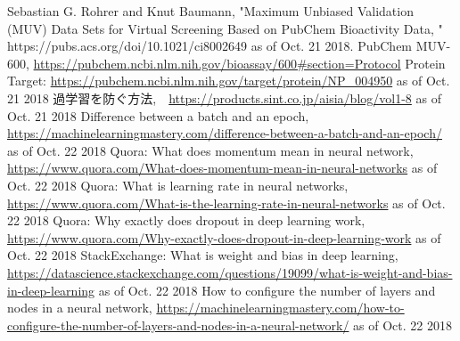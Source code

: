 \documentclass[a4j,11pt]{jarticle}
\begin{document}
\begin{thebibliography}{9}
	 Sebastian G. Rohrer and Knut Baumann, "Maximum Unbiased Validation (MUV) Data Sets for Virtual Screening Based on PubChem Bioactivity Data, "  https://pubs.acs.org/doi/10.1021/ci8002649 as of Oct. 21 2018.
	 PubChem MUV-600, \url{https://pubchem.ncbi.nlm.nih.gov/bioassay/600#section=Protocol} Protein Target: \url{https://pubchem.ncbi.nlm.nih.gov/target/protein/NP_004950} as of Oct. 21 2018
	 過学習を防ぐ方法,　\url{https://products.sint.co.jp/aisia/blog/vol1-8} as of Oct. 21 2018
	 Difference between a batch and an epoch, \url{https://machinelearningmastery.com/difference-between-a-batch-and-an-epoch/} as of Oct. 22 2018
	 Quora: What does momentum mean in neural network, \url{https://www.quora.com/What-does-momentum-mean-in-neural-networks} as of Oct. 22 2018
	 Quora: What is learning rate in neural networks, \url{https://www.quora.com/What-is-the-learning-rate-in-neural-networks} as of Oct. 22 2018
	 Quora: Why exactly does dropout in deep learning work, \url{https://www.quora.com/Why-exactly-does-dropout-in-deep-learning-work} as of Oct. 22 2018
	 StackExchange: What is weight and bias in deep learning, \url{https://datascience.stackexchange.com/questions/19099/what-is-weight-and-bias-in-deep-learning} as of Oct. 22 2018
	 How to configure the number of layers and nodes in a neural network, \url{https://machinelearningmastery.com/how-to-configure-the-number-of-layers-and-nodes-in-a-neural-network/} as of Oct. 22 2018
\end{thebibliography}
\end{document}
